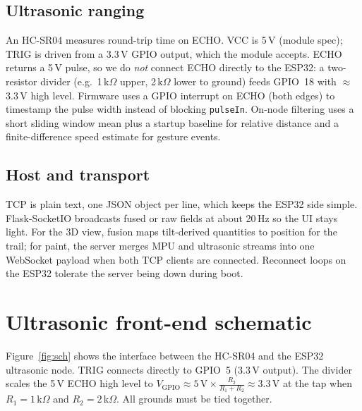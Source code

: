 \documentclass[10pt,twocolumn]{article}
\begin{document}
\subsection{Ultrasonic ranging}

An HC-SR04 measures round-trip time on ECHO. VCC is 5\,V (module spec); TRIG is driven from a
3.3\,V GPIO output, which the module accepts. ECHO returns a 5\,V pulse, so we do \emph{not} connect
ECHO directly to the ESP32: a two-resistor divider (e.g.\ 1\,k$\Omega$ upper, 2\,k$\Omega$ lower to
ground) feeds GPIO~18 with $\approx$\,3.3\,V high level. Firmware uses a GPIO interrupt on ECHO (both
edges) to timestamp the pulse width instead of blocking \texttt{pulseIn}. On-node filtering uses a
short sliding window mean plus a startup baseline for relative distance and a finite-difference
speed estimate for gesture events.

\subsection{Host and transport}

TCP is plain text, one JSON object per line, which keeps the ESP32 side simple. Flask-SocketIO
broadcasts fused or raw fields at about 20\,Hz so the UI stays light. For the 3D view, fusion maps
tilt-derived quantities to position for the trail; for paint, the server merges MPU and ultrasonic
streams into one WebSocket payload when both TCP clients are connected. Reconnect loops on the
ESP32 tolerate the server being down during boot.

\section{Ultrasonic front-end schematic}

Figure~\ref{fig:sch} shows the interface between the HC-SR04 and the ESP32 ultrasonic node.
TRIG connects directly to GPIO~5 (3.3\,V output). The divider scales the 5\,V ECHO high level to
$V_{\mathrm{GPIO}} \approx 5\,\mathrm{V}\times\frac{R_2}{R_1+R_2}\approx 3.3$\,V at the tap when
$R_1=1$\,k$\Omega$ and $R_2=2$\,k$\Omega$. All grounds must be tied together.
\end{document}
